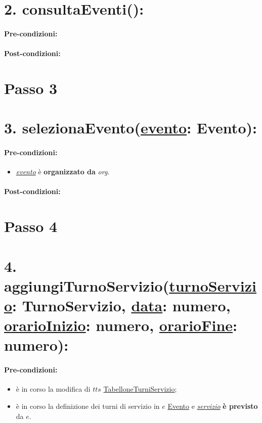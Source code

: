 \section*{2. consultaEventi():}

\paragraph{Pre-condizioni:}

\paragraph{Post-condizioni:}


\section{Passo 3}
\section*{3. selezionaEvento(\underline{evento}: Evento):}

\paragraph{Pre-condizioni:}
\begin{itemize}
     \item \underline{\textit{evento}} è \textbf{organizzato da} {\textit{org}}.
\end{itemize}

\paragraph{Post-condizioni:}

\section{Passo 4}
\section*{4. aggiungiTurnoServizio(\underline{turnoServizio}: TurnoServizio, \underline{data}: numero, \underline{orarioInizio}: numero, \underline{orarioFine}: numero):}

\paragraph{Pre-condizioni:}
\begin{itemize}
    \item è in corso la modifica di $tts$ \underline{TabelloneTurniServizio};
    \item è in corso la definizione dei turni di servizio in $e$ \underline{Evento} e \underline{\textit{servizio}} \textbf{è previsto} da $e$.
\end{itemize}


